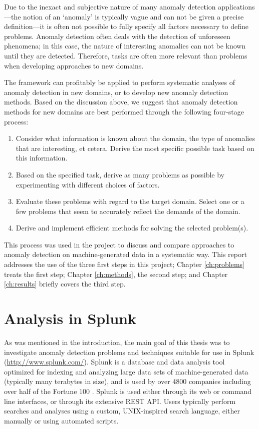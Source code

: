 Due to the inexact and subjective nature of many anomaly detection applications---the notion of an `anomaly' is typically vague and can not be given a precise definition---it is often not possible to fully specify all factors necessary to define problems. Anomaly detection often deals with the detection of unforeseen phenomena; in this case, the nature of interesting anomalies can not be known until they are detected. Therefore, tasks are often more relevant than problems when developing approaches to new domains.

The framework can profitably be applied to perform systematic analyses of anomaly detection in new domains, or to develop new anomaly detection methods. Based on the discussion above, we suggest that anomaly detection methods for new domains are best performed through the following four-stage process:
\begin{enumerate}
  \item Consider what information is known about the domain, the type of anomalies that are interesting, et cetera. Derive the most specific possible task based on this information.
  \item Based on the specified task, derive as many problems as possible by experimenting with different choices of factors.
  \item Evaluate these problems with regard to the target domain. Select one or a few problems that seem to accurately reflect the demands of the domain.
  \item Derive and implement efficient methods for solving the selected problem(s).
\end{enumerate}

This process was used in the project to discuss and compare approaches to anomaly detection on machine-generated data in a systematic way. This report addresses the use of the three first steps in this project; Chapter \ref{ch:problems} treats the first step; Chapter \ref{ch:methods}, the second step; and Chapter \ref{ch:results} briefly covers the third step.

\section{Analysis in Splunk}
\label{sect:splunk}

As was mentioned in the introduction, the main goal of this thesis was to investigate anomaly detection problems and techniques suitable for use in Splunk (\url{http://www.splunk.com/}). Splunk is a database and data analysis tool optimized for indexing and analyzing large data sets of machine-generated data (typically many terabytes in size), and is used by over 4800 companies including over half of the Fortune 100 \cite{splunk}. Splunk is used either through its web or command line interfaces, or through its extensive REST API. Users typically perform searches and analyses using a custom, UNIX-inspired search language, either manually or using automated scripts.

